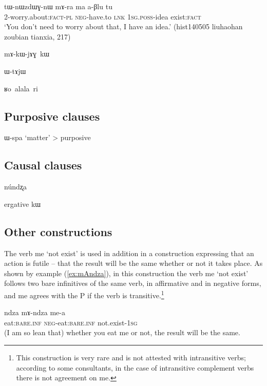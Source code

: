 \documentclass[oldfontcommands,oneside,a4paper,11pt]{article}
\newcommand{\ipa}[1]{\mbox{\phon #1}} %
\begin{document}
\begin{exe}
\ex \label{ex:marama2}
\gll
\ipa{tɯ-nɯzdɯɣ-nɯ} 	\ipa{mɤ-ra} 	\ipa{ma} 	\ipa{a-βlu} 	\ipa{tu}\\
2-worry.about:\textsc{fact-pl} \textsc{neg}-have.to \textsc{lnk} \textsc{1sg.poss}-idea exist:\textsc{fact}\\
\glt `You don't need to worry about that, I have an idea.' (hist140505 liuhaohan zoubian tianxia, 217)
\end{exe}
 

\ipa{mɤ-kɯ-jɤɣ kɯ}

\ipa{ɯ-tɤjɯ}

\ipa{ʁo alala ri}

   \subsection{Purposive clauses}
   
   \ipa{ɯ-spa} `matter' > purposive \citet[212]{heine-kuteva02}
   
   \subsection{Causal clauses}
   \ipa{núndʐa}
   
ergative \ipa{kɯ}   
   
\subsection{Other constructions}
The verb \ipa{me} `not exist' is used in addition in a construction expressing that an action is futile -- that the result will be the same whether or not it takes place. As shown by example (\ref{ex:mAndza}), in this construction the verb \ipa{me} `not exist' follows two bare infinitives of the same verb, in affirmative and in negative forms, and \ipa{me} agrees with the P if the verb is transitive.\footnote{This construction is very rare and is not attested with intransitive verbs; according to some consultants, in the case of intransitive complement verbs there is not agreement on \ipa{me}.}


\begin{exe}
\ex \label{ex:mAndza}
\gll \ipa{ndza} \ipa{mɤ-ndza} \ipa{me-a} \\
eat:\textsc{bare.inf} \textsc{neg}-eat:\textsc{bare.inf} not.exist-\textsc{1sg} \\
\glt (I am so lean that) whether you eat me or not, the result will be the same.
\end{exe}
 
\end{document}

